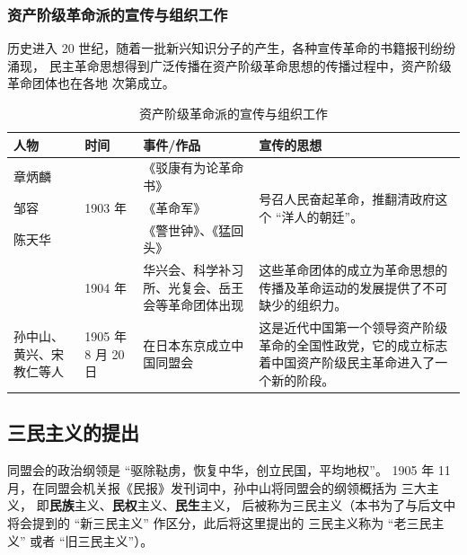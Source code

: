 \documentclass[10pt, UTF8]{book} %
\begin{document}
\subsubsection{资产阶级革命派的宣传与组织工作}

历史进入 20 世纪，随着一批新兴知识分子的产生，各种宣传革命的书籍报刊纷纷涌现，
民主革命思想得到广泛传播在资产阶级革命思想的传播过程中，资产阶级革命团体也在各地
次第成立。

\begin{table}[H]
    \centering
    \caption{资产阶级革命派的宣传与组织工作}
    \begin{tabular}{p{}|p{}|p{}|p{}}
        \toprule
        人物 & 时间 & 事件/作品 & 宣传的思想 \\ 
        \hline
        章炳麟 & \multirow{3}{*}{1903 年} & 《驳康有为论革命书》
        & \multirow{3}{0.3\textwidth}{号召人民奋起革命，推翻清政府这个 “洋人的朝廷”。}\\
        邹容 &  & 《革命军》&\\
        陈天华 & & 《警世钟》、《猛回头》&\\
        \hline
        & 1904 年 & 华兴会、科学补习所、光复会、岳王会等革命团体出现 &
        这些革命团体的成立为革命思想的传播及革命运动的发展提供了不可缺少的组织力。 \\
        \hline
        孙中山、黄兴、宋教仁等人 & 1905 年 8 月 20 日 & 在日本东京成立中国同盟会 
        & 这是近代中国第一个领导资产阶级
        革命的全国性政党，它的成立标志着中国资产阶级民主革命进入了一个新的阶段。 \\
        \bottomrule
    \end{tabular}    
\end{table}

\subsection{三民主义的提出}

同盟会的政治纲领是 “驱除鞑虏，恢复中华，创立民国，平均地权”。
1905 年 11 月，在同盟会机关报《民报》发刊词中，孙中山将同盟会的纲领概括为
三大主义， 即\textbf{民族}主义、\textbf{民权}主义、\textbf{民生}主义，
后被称为三民主义（本书为了与后文中将会提到的 “新三民主义” 作区分，此后将这里提出的
三民主义称为 “老三民主义” 或者 “旧三民主义”）。
\end{document}
